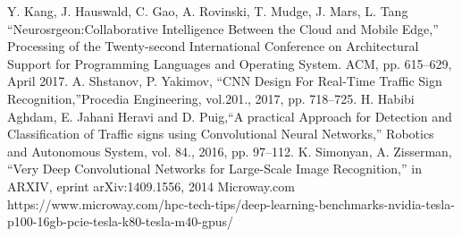 \documentclass[conference]{IEEEtran}
\begin{document}
\begin{thebibliography}{00}
 Y. Kang, J. Hauswald, C. Gao, A. Rovinski, T. Mudge, J. Mars, L. Tang ``Neurosrgeon:Collaborative Intelligence Between the Cloud and Mobile Edge,'' Processing of the Twenty-second International Conference on Architectural Support for Programming Languages and Operating System. ACM, pp. 615--629, April 2017.
 A. Shstanov, P. Yakimov, ``CNN Design For Real-Time Traffic Sign Recognition,''Procedia Engineering, vol.201., 2017, pp. 718--725.
 H. Habibi Aghdam, E. Jahani Heravi and D. Puig,``A practical Approach for Detection and Classification of Traffic signs using Convolutional Neural Networks,'' Robotics and Autonomous System, vol. 84., 2016, pp. 97--112.
 K. Simonyan, A. Zisserman, ``Very Deep Convolutional Networks for Large-Scale Image Recognition,'' in ARXIV, eprint arXiv:1409.1556, 2014
 Microway.com https://www.microway.com/hpc-tech-tips/deep-learning-benchmarks-nvidia-tesla-p100-16gb-pcie-tesla-k80-tesla-m40-gpus/
\end{thebibliography}
\end{document}
